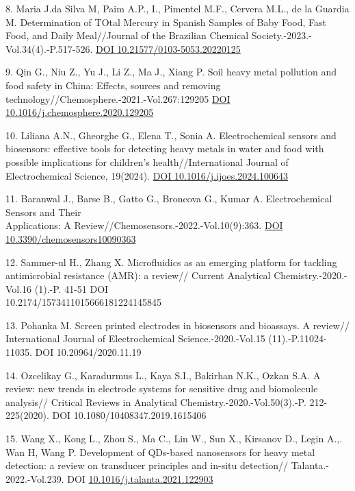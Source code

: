 \begin{references}
8. Maria J.da Silva M, Paim A.P., I., Pimentel M.F., Cervera M.L.,
de la Guardia M. Determination of TOtal Mercury in Spanish Samples
of Baby Food, Fast Food, and Daily Meal//Journal of the
Brazilian Chemical Society.-2023.-Vol.34(4).-P.517-526.
\href{http://dx.doi.org/10.21577/0103-5053.20220125}{DOI
10.21577/0103-5053.20220125}

9. Qin G., Niu Z., Yu J., Li Z., Ma J., Xiang P. Soil heavy
metal pollution and food safety in China: Effects, sources and
removing technology//Chemosphere.-2021.-Vol.267:129205
\href{https://doi.org/10.1016/j.chemosphere.2020.129205}{DOI\\
10.1016/j.chemosphere.2020.129205}

10. Liliana A.N., Gheorghe G., Elena T., Sonia A. Electrochemical
sensors and biosensors: effective tools for detecting heavy
metals in water and food with possible implications for
children's health//International Journal of Electrochemical
Science, 19(2024).
\href{https://doi.org/10.1016/j.ijoes.2024.100643}{DOI
10.1016/j.ijoes.2024.100643}

11. Baranwal J., Barse B., Gatto G., Broncova G., Kumar A.
Electrochemical Sensors and Their \\Applications: A
Review//Chemosensors.-2022.-Vol.10(9):363.
\href{https://doi.org/10.3390/chemosensors10090363}{DOI
10.3390/chemosensors10090363}

12. Sammer-ul H., Zhang X. Microfluidics as an emerging platform
for tackling antimicrobial resistance (AMR): a review// Current
Analytical Chemistry.-2020.-Vol.16 (1).-P. 41-51
DOI \\10.2174/1573411015666181224145845

13. Pohanka M. Screen printed electrodes in biosensors and
bioassays. A review// International Journal of Electrochemical
Science.-2020.-Vol.15 (11).-P.11024-11035.
DOI 10.20964/2020.11.19

14. Ozcelikay G., Karadurmus L., Kaya S.I., Bakirhan N.K., Ozkan
S.A. A review: new trends in electrode systems for sensitive
drug and biomolecule analysis// Critical Reviews in Analytical
Chemistry.-2020.-Vol.50(3).-P. 212-225(2020). DOI
10.1080/10408347.2019.1615406

15. Wang X., Kong L., Zhou S., Ma C., Lin W., Sun X., Kirsanov
D., Legin A.,. Wan H, Wang P. Development of QDs-based nanosensors
for heavy metal detection: a review on transducer principles and
in-situ detection// Talanta.- 2022.-Vol.239. DOI
\href{https://doi.org/10.1016/j.talanta.2021.122903}{10.1016/j.talanta.2021.122903}


\end{references}
